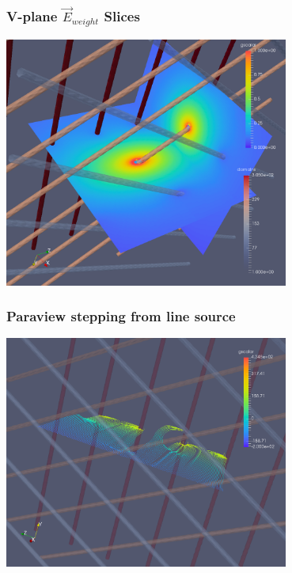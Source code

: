 \documentclass[xcolor=dvipsnames]{beamer}
\begin{document}
\begin{frame}
  \frametitle{V-plane $\vec{E}_{weight}$ Slices}
  \begin{center}
      \includegraphics[width=0.7\textwidth]{cap-vweight-field-fine-slices.png}
  \end{center}
\end{frame}

\begin{frame}
  \frametitle{Paraview stepping from line source}
  \begin{center}
      \includegraphics[width=0.7\textwidth]{track-drift-2.png}
  \end{center}
\end{frame}
\end{document}
